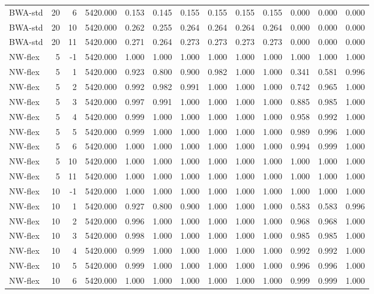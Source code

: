 \begin{table}
\begin{tabular}{lrrrrrrrrrrrr}
BWA-std & 20 & 6 & 5420.000 & 0.153 & 0.145 & 0.155 & 0.155 & 0.155 & 0.155 & 0.000 & 0.000 & 0.000 \\
BWA-std & 20 & 10 & 5420.000 & 0.262 & 0.255 & 0.264 & 0.264 & 0.264 & 0.264 & 0.000 & 0.000 & 0.000 \\
BWA-std & 20 & 11 & 5420.000 & 0.271 & 0.264 & 0.273 & 0.273 & 0.273 & 0.273 & 0.000 & 0.000 & 0.000 \\
NW-flex & 5 & -1 & 5420.000 & 1.000 & 1.000 & 1.000 & 1.000 & 1.000 & 1.000 & 1.000 & 1.000 & 1.000 \\
NW-flex & 5 & 1 & 5420.000 & 0.923 & 0.800 & 0.900 & 0.982 & 1.000 & 1.000 & 0.341 & 0.581 & 0.996 \\
NW-flex & 5 & 2 & 5420.000 & 0.992 & 0.982 & 0.991 & 1.000 & 1.000 & 1.000 & 0.742 & 0.965 & 1.000 \\
NW-flex & 5 & 3 & 5420.000 & 0.997 & 0.991 & 1.000 & 1.000 & 1.000 & 1.000 & 0.885 & 0.985 & 1.000 \\
NW-flex & 5 & 4 & 5420.000 & 0.999 & 1.000 & 1.000 & 1.000 & 1.000 & 1.000 & 0.958 & 0.992 & 1.000 \\
NW-flex & 5 & 5 & 5420.000 & 0.999 & 1.000 & 1.000 & 1.000 & 1.000 & 1.000 & 0.989 & 0.996 & 1.000 \\
NW-flex & 5 & 6 & 5420.000 & 1.000 & 1.000 & 1.000 & 1.000 & 1.000 & 1.000 & 0.994 & 0.999 & 1.000 \\
NW-flex & 5 & 10 & 5420.000 & 1.000 & 1.000 & 1.000 & 1.000 & 1.000 & 1.000 & 1.000 & 1.000 & 1.000 \\
NW-flex & 5 & 11 & 5420.000 & 1.000 & 1.000 & 1.000 & 1.000 & 1.000 & 1.000 & 1.000 & 1.000 & 1.000 \\
NW-flex & 10 & -1 & 5420.000 & 1.000 & 1.000 & 1.000 & 1.000 & 1.000 & 1.000 & 1.000 & 1.000 & 1.000 \\
NW-flex & 10 & 1 & 5420.000 & 0.927 & 0.800 & 0.900 & 1.000 & 1.000 & 1.000 & 0.583 & 0.583 & 0.996 \\
NW-flex & 10 & 2 & 5420.000 & 0.996 & 1.000 & 1.000 & 1.000 & 1.000 & 1.000 & 0.968 & 0.968 & 1.000 \\
NW-flex & 10 & 3 & 5420.000 & 0.998 & 1.000 & 1.000 & 1.000 & 1.000 & 1.000 & 0.985 & 0.985 & 1.000 \\
NW-flex & 10 & 4 & 5420.000 & 0.999 & 1.000 & 1.000 & 1.000 & 1.000 & 1.000 & 0.992 & 0.992 & 1.000 \\
NW-flex & 10 & 5 & 5420.000 & 0.999 & 1.000 & 1.000 & 1.000 & 1.000 & 1.000 & 0.996 & 0.996 & 1.000 \\
NW-flex & 10 & 6 & 5420.000 & 1.000 & 1.000 & 1.000 & 1.000 & 1.000 & 1.000 & 0.999 & 0.999 & 1.000 \\

\end{tabular}
\end{table}

